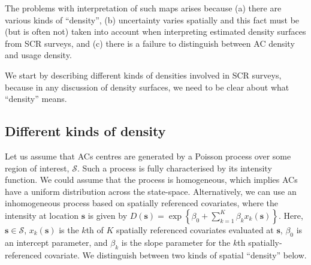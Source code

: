\documentclass[useAMS,usenatbib,referee]{biom}
\begin{document}
The problems with interpretation of such maps arises because (a) there are various kinds of ``density'', (b) uncertainty varies spatially and this fact must be (but is often not) taken into account when interpreting estimated density surfaces from SCR surveys, and (c) there is a failure to distinguish between AC density and usage density. 

We start by describing different kinds of densities involved in SCR surveys, because in any discussion of density surfaces, we need to be clear about what ``density'' means. %



\subsection{Different kinds of density}\label{different-densities}

Let us assume that ACs centres are generated by a Poisson process over some region of interest, $\mathcal{S}$. Such a process is fully characterised by its intensity function. We could assume that the process is homogeneous, which implies ACs have a uniform distribution across the state-space. Alternatively, we can use an inhomogeneous process based on spatially referenced covariates, where the intensity at location $\bm{s}$ is given by $D(\bm{s})=\exp\left\{\beta_0 + \sum_{k=1}^K\beta_kx_k(\bm{s})\right\}$. Here, $\bm{s} \in \mathcal{S}$, $x_k(\bm{s})$ is the $k$th of $K$ spatially referenced covariates evaluated at $\bm{s}$, $\beta_0$ is an intercept parameter, and $\beta_k$ is the slope parameter for the $k$th spatially-referenced covariate. We distinguish between two kinds of spatial ``density'' below.
\end{document}

